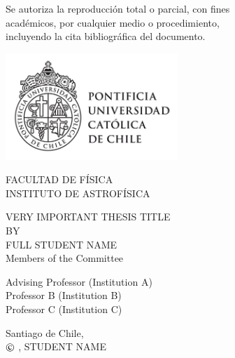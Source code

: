 \documentclass{mythesis}
\makeatletter
\newcommand\Romanyear{\@Roman{\year}}
\makeatother
\begin{document}
\begin{center}
\vspace*{0.25\textheight}
Se autoriza la reproducci\'{o}n total o parcial, con fines\\ 
acad\'{e}micos, por cualquier medio o procedimiento,\\ 
incluyendo la cita bibliogr\'{a}fica del documento.
\vspace*{\fill}
\end{center}
\newpage
\makeatletter\@twosidefalse\makeatother
{}

\pagestyle{empty}
\vspace*{-40.0mm}%
\hspace*{-10mm}%
        \parbox{80pt}
{\centering %
            \includegraphics*[width=65mm]{./figures/UC_lineal_TR-01.png}\\[.2\normalbaselineskip]   
        }
\begin{flushright}
\vspace*{-9.0mm}
FACULTAD DE F\'{I}SICA\\
INSTITUTO DE ASTROF\'{I}SICA
\end{flushright}
\begin{center}
\huge{VERY IMPORTANT THESIS TITLE}\\
\vspace{1.5cm}
\normalsize
BY\\
\Large{FULL STUDENT NAME}\\
\vspace{1.5cm}
\vspace{1.cm}
\normalsize Members of the Committee\\
\vspace{.5cm}
\parbox{250pt}{
\large{Advising Professor \hfill (Institution A)\\
Professor B \hfill (Institution B)\\
Professor C \hfill (Institution C)\\}}
\vfill
\normalsize
Santiago de Chile, \monthname\, \the\year\\
\vspace{1.cm}
$\copyright$ \Romanyear, STUDENT NAME
\end{center}
\newpage
\end{document}
